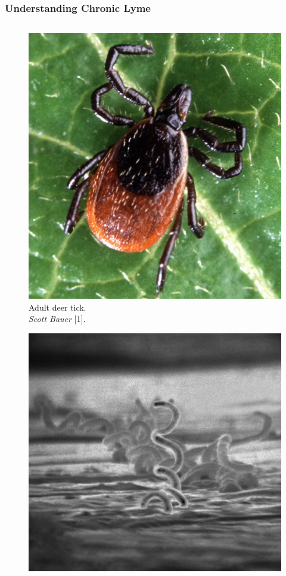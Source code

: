 \documentclass[usenames,dvipsnames,15pt]{beamer}
\begin{document}
\begin{frame}
  \frametitle{Understanding Chronic Lyme}
  \begin{columns}
    \begin{column}{.25\textwidth}
      \begin{figure}
        \vspace{-.5cm}
        \includegraphics[scale=.35]{pictures/tick.jpg}\\
        {\tiny Adult deer tick.\\\vspace{-.2cm}\emph{Scott Bauer} [1].}
      \end{figure}\vspace{-1.25cm}
      \begin{figure}
        \includegraphics[scale=1.4]{pictures/spiro.jpg}\\

\end{figure}
\end{column}
\end{columns}
\end{frame}
\end{document}
